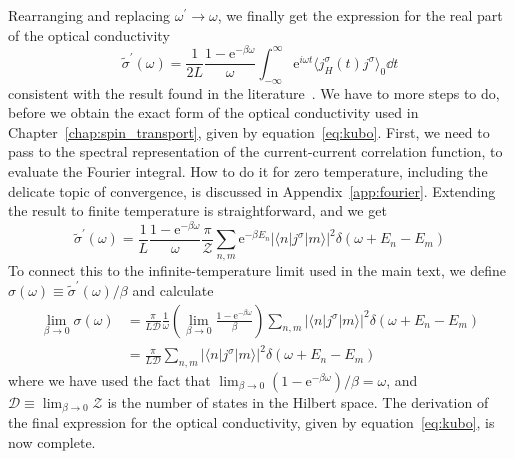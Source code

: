 Rearranging and replacing \(\omega^{\prime} \to \omega \), we finally get the expression for the real part of the
optical conductivity
\begin{equation}
    \tilde{\sigma}^{\prime}(\omega ) = \frac{1}{2L} \frac{1-\mathrm{e}^{-\beta \omega }}{\omega } \int_{-\infty}^{\infty}   \mathrm{e}^{i \omega t} \langle j^{\sigma }_{H}(t) j^{\sigma } \rangle_0 \dd{t} 
\end{equation}
consistent with the result found in the literature~\autocite{Mahan2000,Gohmann2022,Sirker2020}. We have to more steps
to do, before we obtain the exact form of the optical conductivity used in Chapter~\ref{chap:spin_transport}, given by
equation~\eqref{eq:kubo}. First, we need to pass to the spectral representation of the current-current correlation function,
to evaluate the Fourier integral. How to do it for zero temperature, including the delicate topic of convergence, is discussed
in Appendix~\ref{app:fourier}. Extending the result to finite temperature is straightforward, and we get
\begin{equation}
    \tilde{\sigma}^{\prime}(\omega ) = \frac{1}{L} \frac{1-\mathrm{e}^{-\beta \omega }}{\omega } \frac{\pi }{\mathcal{Z} }
    \sum_{n,m} \mathrm{e}^{-\beta E_n} \left| \langle n | j^{\sigma } | m \rangle \right|^2 \delta (\omega  + E_n - E_m)
\end{equation}
To connect this to the infinite-temperature limit used in the main text, we define
\(\sigma (\omega )\equiv \tilde{\sigma }^{\prime} (\omega )/\beta \) and calculate
\begin{align}
    \lim_{\beta  \to 0} \sigma(\omega ) & = \frac{\pi}{L \mathcal{D} } \frac{1}{\omega }\left( \lim_{\beta  \to 0} \frac{1-\mathrm{e}^{-\beta \omega } }{\beta } \right)
    \sum _{n,m} \left| \langle n | j^{\sigma } | m \rangle \right|^2 \delta (\omega  + E_n - E_m) \nonumber                                                              \\
                                        & = \frac{\pi}{L \mathcal{D} } \sum _{n,m} \left| \langle n | j^{\sigma } | m \rangle \right|^2 \delta (\omega  + E_n - E_m)
\end{align}
where we have used the fact that \(\lim_{\beta  \to 0} (1-\mathrm{e}^{-\beta \omega })/\beta = \omega \), and
\(\mathcal{D} \equiv \lim_{\beta  \to 0} \mathcal{Z} \) is the number of states in the Hilbert space.
The derivation of the final expression for the optical conductivity, given by equation~\eqref{eq:kubo}, is now complete.
